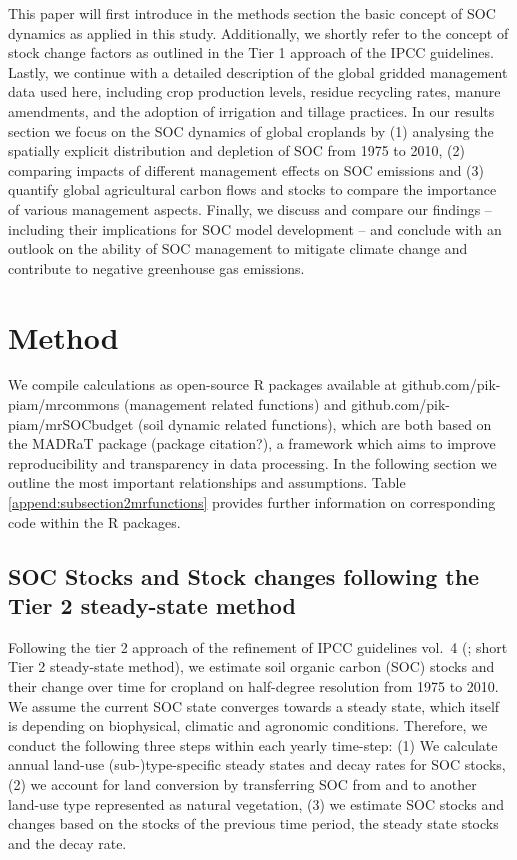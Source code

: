 \documentclass[gc, manuscript]{copernicus}
\begin{document}
This paper will first introduce in the methods section the basic concept of SOC dynamics as applied in this study. Additionally, we shortly refer to the concept of stock change factors as outlined in the Tier 1 approach of the IPCC guidelines. Lastly, we continue with a detailed description of the global gridded management data used here, including crop production levels, residue recycling rates, manure amendments, and the adoption of irrigation and tillage practices. In our results section we focus on the SOC dynamics of global croplands by (1) analysing the spatially explicit distribution and depletion of SOC from 1975 to 2010, (2) comparing impacts of different management effects on SOC emissions and (3) quantify global agricultural carbon flows and stocks to compare the importance of various management aspects. Finally, we discuss and compare our findings -- including their implications for SOC model development -- and conclude with an outlook on the ability of SOC management to mitigate climate change and contribute to negative greenhouse gas emissions.
\newpage

\hypertarget{method}{%
\section{Method}\label{method}}

We compile calculations as open-source R packages available at github.com/pik-piam/mrcommons (management related functions) and github.com/pik-piam/mrSOCbudget (soil dynamic related functions), which are both based on the MADRaT package (package citation?), a framework which aims to improve reproducibility and transparency in data processing.
In the following section we outline the most important relationships and assumptions. Table \ref{append:subsection2mrfunctions} provides further information on corresponding code within the R packages.

\hypertarget{sec:carbonbudget}{%
\subsection{SOC Stocks and Stock changes following the Tier 2 steady-state method}\label{sec:carbonbudget}}

Following the tier 2 approach of the refinement of IPCC guidelines vol.~4 (\citet{ipcc_2019_2019}; short Tier 2 steady-state method), we estimate soil organic carbon (SOC) stocks and their change over time for cropland on half-degree resolution from 1975 to 2010. We assume the current SOC state converges towards a steady state, which itself is depending on biophysical, climatic and agronomic conditions. Therefore, we conduct the following three steps within each yearly time-step:
(1) We calculate annual land-use (sub-)type-specific steady states and decay rates for SOC stocks,
(2) we account for land conversion by transferring SOC from and to another land-use type represented as natural vegetation,
(3) we estimate SOC stocks and changes based on the stocks of the previous time period, the steady state stocks and the decay rate.
\end{document}
